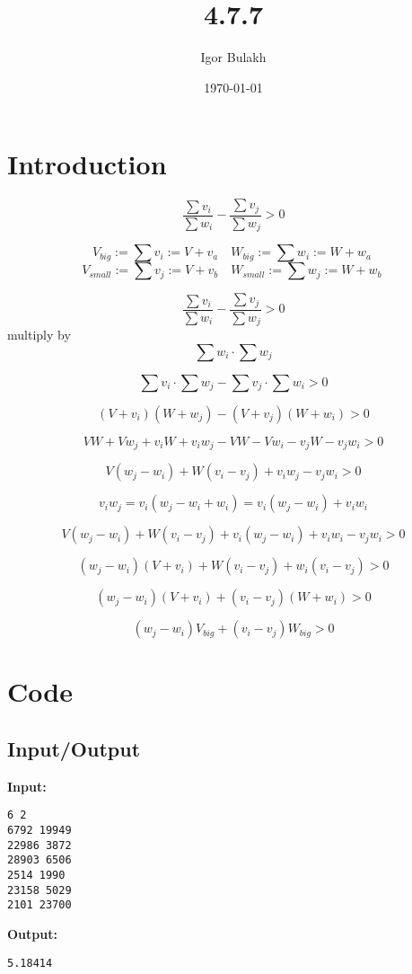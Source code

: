 \documentclass[a4paper,12pt]{article} %
\title{4.7.7}
\author{Igor Bulakh}
\date{\today}
\begin{document}
\maketitle

\section{Introduction}

$$\frac{\sum v_i}{\sum w_i} - \frac{\sum v_j}{\sum w_j} > 0$$

$$
V_{big} := \sum v_i := V + v_a\quad
W_{big} := \sum w_i := W + w_a\
$$
$$
V_{small} := \sum v_j := V + v_b\quad
W_{small} := \sum w_j := W + w_b\
$$

$$\frac{\sum v_i}{\sum w_i} - \frac{\sum v_j}{\sum w_j} > 0$$  multiply by $${\sum w_i} \cdot {\sum w_j}$$

$$\sum v_i \cdot \sum w_j - \sum v_j \cdot \sum w_i > 0$$

$$(V+v_i)(W+w_j) - (V + v_j)(W + w_i) > 0$$

$$V W + V w_j + v_i W + v_i w_j - V W - V w_i - v_j W - v_j w_i > 0$$

$$V(w_j - w_i) + W(v_i - v_j) + v_i w_j - v_j w_i > 0$$

$$v_i w_j = v_i (w_j - w_i + w_i) = v_i (w_j - w_i) + v_i w_i$$

$$V(w_j - w_i) + W(v_i - v_j) + v_i (w_j - w_i) + v_i w_i - v_j w_i > 0$$

$$(w_j - w_i)(V + v_i) + W(v_i - v_j) + w_i(v_i - v_j) > 0$$

$$(w_j - w_i)(V + v_i) + (v_i - v_j)(W + w_i) > 0$$

$$(w_j - w_i)V_{big} + (v_i - v_j)W_{big} > 0$$

\section{Code}

\subsection{Input/Output}

\textbf{Input:}
\begin{lstlisting}
6 2
6792 19949
22986 3872
28903 6506
2514 1990
23158 5029
2101 23700
\end{lstlisting}
\textbf{Output:}
\begin{lstlisting}
5.18414
\end{lstlisting}
\end{document}
